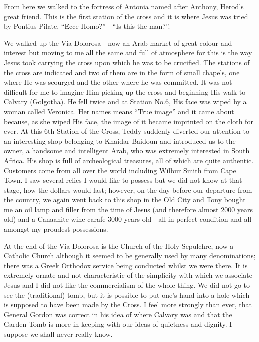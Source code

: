 From here we walked to the fortress of Antonia named after Anthony,
Herod's great friend. This is the first station of the cross and it is
where Jesus was tried by Pontius Pilate, ``Ecce Homo?'' - ``Is this
the man?''.

We walked up the Via Dolorosa - now an Arab market of great colour and
interest but moving to me all the same and full of atmosphere for this
is the way Jesus took carrying the cross upon which he was to be
crucified. The stations of the cross are indicated and two of them are
in the form of small chapels, one where He was scourged and the other
where he was committed. It was not difficult for me to imagine Him
picking up the cross and beginning His walk to Calvary (Golgotha). He
fell twice and at Station No.6, His face was wiped by a woman called
Veronica. Her names means ``True image'' and it came about because, as
she wiped His face, the image of it became imprinted on the cloth for
ever. At this 6th Station of the Cross, Teddy suddenly diverted our
attention to an interesting shop belonging to Khaidar Baidoun and
introduced us to the owner, a handsome and intelligent Arab, who was
extremely interested in South Africa. His shop is full of
archeological treasures, all of which are quite authentic. Customers
come from all over the world including Wilbur Smith from Cape Town. I
saw several relics I would like to possess but we did not know at that
stage, how the dollars would last; however, on the day before our
departure from the country, we again went back to this shop in the Old
City and Tony bought me an oil lamp and filler from the time of Jesus
(and therefore almost 2000 years old) and a Canaanite wine carafe 3000
years old - all in perfect condition and all amongst my proudest
possessions.

At the end of the Via Dolorosa is the Church of the Holy Sepulchre,
now a Catholic Church although it seemed to be generally used by many
denominations; there was a Greek Orthodox service being conducted
whilst we were there. It is extremely ornate and not characteristic of
the simplicity with which we associate Jesus and I did not like the
commercialism of the whole thing. We did not go to see the
(traditional) tomb, but it is possible to put one's hand into a hole
which is supposed to have been made by the Cross. I feel more strongly
than ever, that General Gordon was correct in his idea of where
Calvary was and that the Garden Tomb is more in keeping with our ideas
of quietness and dignity. I suppose we shall never really know.

